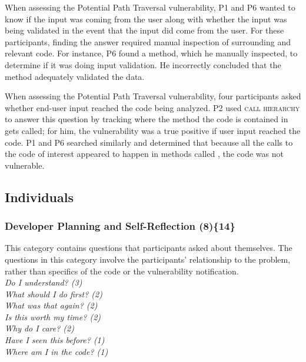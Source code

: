 \documentclass{sig-alternate}
\begin{document}
 
When assessing the Potential Path Traversal vulnerability, P1 and P6 wanted to know if the input was coming from the user along with whether the input was being validated in the event that the input did come from the user.
For these participants, finding the answer required manual inspection of surrounding and relevant code. 
For instance, P6 found a  method, which he manually inspected, to determine if it was doing input validation.
He incorrectly concluded that the  method adequately validated the data.

When assessing the Potential Path Traversal vulnerability, four participants asked whether end-user input reached the code being analyzed.
P2 used \textsc{call hierarchy} to answer this question by tracking where the method the code is contained in gets called; for him, the vulnerability was a true positive if user input reached the code.
P1 and P6 searched similarly and determined that because all the calls to the code of interest appeared to happen in methods called , the code was not vulnerable.


\subsection{Individuals}
\vspace{-3mm}
\label{sec:results-i}
\subsubsection{\textbf{Developer Planning and Self-Reflection (8)\{14\}}} \label{dpr}
 
This category contains questions that participants asked about themselves.
The questions in this category involve the participants' relationship to the problem, rather than specifics of the code or the vulnerability notification.
\\

\noindent\emph{Do I understand? (3)} \\
\emph{What should I do first? (2)} \\
\emph{What was that again? (2)} \\
\emph{Is this worth my time? (2)} \\
\emph{Why do I care? (2)} \\
\emph{Have I seen this before? (1)} \\
\emph{Where am I in the code? (1)} 
\\
\end{document}
